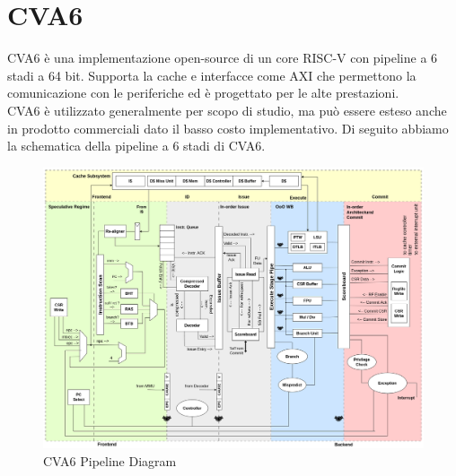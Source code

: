 \section*{CVA6}
CVA6 \cite{openhwgroup} è una implementazione open-source di un core RISC-V con pipeline a 6 stadi a 64 bit. Supporta la cache e interfacce come AXI che permettono la comunicazione con le periferiche ed è progettato per le alte prestazioni.\\
CVA6 è utilizzato generalmente per scopo di studio, ma può essere esteso anche in prodotto commerciali dato il basso costo implementativo. Di seguito abbiamo la schematica della pipeline a 6 stadi di CVA6.
\vspace{1cm}
\FloatBarrier
\begin{figure}[!htbp]
    \centering
    \includegraphics[width=1\linewidth]{images/cva6-scheme.png}
    \caption{CVA6 Pipeline Diagram} 
\end{figure}
\FloatBarrier
\vspace{1cm}
